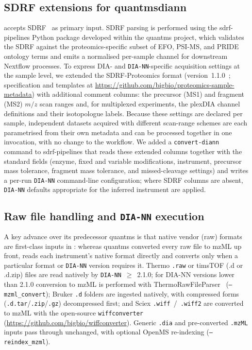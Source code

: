 \documentclass[preprint,12pt]{elsarticle}
\begin{document}
\subsection{SDRF extensions for quantmsdiann}
\quantmsdiann{} accepts SDRF~\cite{dai2021sdrf} as primary input.
SDRF parsing is performed using the sdrf-pipelines Python package developed within the quantms project, which validates the SDRF against the proteomics-specific subset of EFO, PSI-MS, and PRIDE ontology terms and emits a normalised per-sample channel for downstream Nextflow processes. To express DIA- and \texttt{DIA-NN}-specific acquisition settings at the sample level, we extended the SDRF-Proteomics format (version~1.1.0~\cite{dai2021sdrf}; specification and templates at \url{https://github.com/bigbio/proteomics-sample-metadata}) with additional comment columns: the precursor (MS1) and fragment (MS2) $m/z$ scan ranges and, for multiplexed experiments, the plexDIA channel definitions and their isotopologue labels. Because these settings are declared per sample, independent datasets acquired with different scan-range schemes are each parametrised from their own metadata and can be processed together in one invocation, with no change to the workflow. We added a \texttt{convert-diann} command to sdrf-pipelines that reads these extended columns together with the standard fields (enzyme, fixed and variable modifications, instrument, precursor mass tolerance, fragment mass tolerance, and missed-cleavage settings) and writes a per-run \texttt{DIA-NN} command-line configuration; where SDRF columns are absent, \texttt{DIA-NN} defaults appropriate for the inferred instrument are applied.

\subsection{Raw file handling and \texttt{DIA-NN} execution}
A key advance over its predecessor quantms is that native vendor (raw) formats are first-class inputs in \quantmsdiann{}: whereas quantms converted every raw file to mzML up front, \quantmsdiann{} reads each instrument's native format directly and converts only when a particular format or \texttt{DIA-NN} version requires it. Thermo \texttt{.raw} or timsTOF (.d or .d.zip) files are read natively by \texttt{DIA-NN}~$\geq$~2.1.0; for DIA-NN versions lower than 2.1.0 conversion to mzML is performed with ThermoRawFileParser~\cite{hulstaert2020} (\texttt{--mzml\_convert}); Bruker \texttt{.d} folders are ingested natively, with compressed forms (\texttt{.d.tar}/\texttt{.zip}/\texttt{.gz}) decompressed first; and Sciex \texttt{.wiff}~/~\texttt{.wiff2} are converted to mzML with the open-source \texttt{wiffconverter} (\url{https://github.com/bigbio/wiffconverter}). Generic \texttt{.dia} and pre-converted \texttt{.mzML} inputs pass through unchanged, with optional OpenMS re-indexing (\texttt{--reindex\_mzml}).
\end{document}
